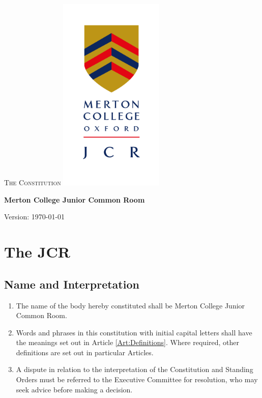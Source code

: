 \documentclass[11pt,a4paper, oneside]{memoir}
\begin{document}
	\pagestyle{plain}
	\thispagestyle{empty}
	\begin{center}
		\null\vfill
		{\Huge 
			\textsc{The Constitution}
			\linebreak
		}
		\vfill
		\includegraphics[width=5cm]{mertoncollegejcr}
		\vfill
		\begin{Spacing}{1.3}
			\huge
			\textbf{Merton College Junior Common Room}
			\linebreak
		\end{Spacing}
		\begin{Spacing}{1.3}
			\Large
			Version: \today
		\end{Spacing}
		
		\vfill
	\end{center}
	\cleardoublepage
	\frontmatter
	\tableofcontents*
	\mainmatter
	\pagestyle{plain}
	\chapter{The JCR}
	\section{Name and Interpretation}
	\label{Art:Name}
	\begin{enumerate}
		\item The name of the body hereby constituted shall be Merton College Junior Common Room. 
		\item Words and phrases in this constitution with initial capital letters shall have the meanings set out in Article \ref{Art:Definitions}.
		Where required, other definitions are set out in particular Articles.
		\item A dispute in relation to the interpretation of the Constitution and Standing Orders must be referred to the Executive Committee for resolution, who may seek advice before making a decision.
	\end{enumerate}
\end{document}
